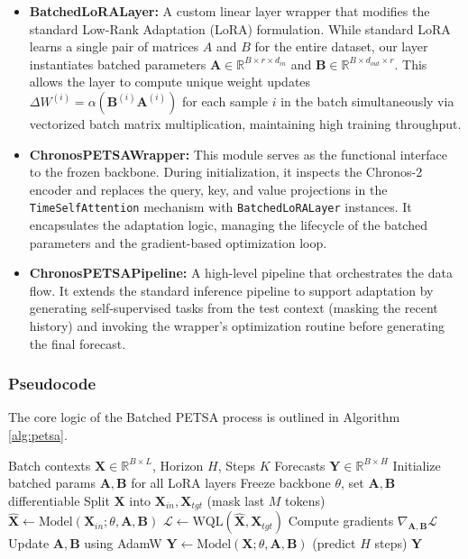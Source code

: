 \documentclass[conference]{IEEEtran}
\begin{document}
\begin{itemize}
    \item \textbf{BatchedLoRALayer:} A custom linear layer wrapper that modifies the standard Low-Rank Adaptation (LoRA) formulation. While standard LoRA learns a single pair of matrices $A$ and $B$ for the entire dataset, our layer instantiates batched parameters $\mathbf{A} \in \mathbb{R}^{B \times r \times d_{in}}$ and $\mathbf{B} \in \mathbb{R}^{B \times d_{out} \times r}$. This allows the layer to compute unique weight updates $\Delta W^{(i)} = \alpha (\mathbf{B}^{(i)} \mathbf{A}^{(i)})$ for each sample $i$ in the batch simultaneously via vectorized batch matrix multiplication, maintaining high training throughput.
    
    \item \textbf{ChronosPETSAWrapper:} This module serves as the functional interface to the frozen backbone. During initialization, it inspects the Chronos-2 encoder and replaces the query, key, and value projections in the \texttt{TimeSelfAttention} mechanism with \texttt{BatchedLoRALayer} instances. It encapsulates the adaptation logic, managing the lifecycle of the batched parameters and the gradient-based optimization loop.
    
    \item \textbf{ChronosPETSAPipeline:} A high-level pipeline that orchestrates the data flow. It extends the standard inference pipeline to support adaptation by generating self-supervised tasks from the test context (masking the recent history) and invoking the wrapper's optimization routine before generating the final forecast.
\end{itemize}

\subsubsection{Pseudocode}
The core logic of the Batched PETSA process is outlined in Algorithm \ref{alg:petsa}.

\begin{algorithm}
\caption{Batched Test-Time Adaptation Strategy}
\begin{algorithmic}
\REQUIRE Batch contexts $\mathbf{X} \in \mathbb{R}^{B \times L}$, Horizon $H$, Steps $K$
\ENSURE Forecasts $\mathbf{Y} \in \mathbb{R}^{B \times H}$
\STATE Initialize batched params $\mathbf{A}, \mathbf{B}$ for all LoRA layers
\STATE Freeze backbone $\theta$, set $\mathbf{A}, \mathbf{B}$ differentiable
    \STATE Split $\mathbf{X}$ into $\mathbf{X}_{in}, \mathbf{X}_{tgt}$ (mask last $M$ tokens)
    \STATE $\hat{\mathbf{X}} \leftarrow \text{Model}(\mathbf{X}_{in}; \theta, \mathbf{A}, \mathbf{B})$
    \STATE $\mathcal{L} \leftarrow \text{WQL}(\hat{\mathbf{X}}, \mathbf{X}_{tgt})$
    \STATE Compute gradients $\nabla_{\mathbf{A}, \mathbf{B}} \mathcal{L}$
    \STATE Update $\mathbf{A}, \mathbf{B}$ using AdamW
\ENDFOR
\STATE $\mathbf{Y} \leftarrow \text{Model}(\mathbf{X}; \theta, \mathbf{A}, \mathbf{B})$ (predict $H$ steps)
\RETURN $\mathbf{Y}$
\end{algorithmic}
\label{alg:petsa}
\end{algorithm}
\end{document}
